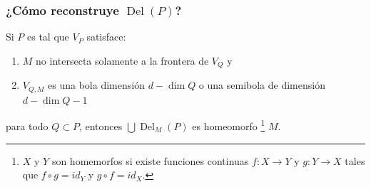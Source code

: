 \documentclass{beamer}
\makeatletter
\DeclarePairedDelimiter{\norm}{\|}{\|}
\let\oldnorm\norm
\def\norm{\@ifstar{\oldnorm}{\oldnorm*}}
\newcommand{\TT}{\mathcal{T}}
\DeclareMathOperator{\conv}{conv}
\DeclareMathOperator{\Del}{Del}
\makeatother
\begin{document}
%
%
\begin{frame}\frametitle{¿Cómo reconstruye \(\Del(P)\)?}
\begin{Teorema}
  Si \(P\) es tal que \(V_P\) satisface:
  \begin{enumerate}[1.]
    \item \(M\) no intersecta solamente a la frontera de \(V_Q\) y
    \item \(V_{Q,M}\) es una bola dimensión \(d-\dim Q\) o una semibola de dimensión \(d-\dim Q-1\)  
  \end{enumerate}
  para todo \(Q\subset P\), 
  entonces \(\bigcup \Del_{M}(P)\) es homeomorfo%
  \footnote[frame]{\(X\) y \(Y\) son homemorfos si existe funciones continuas \(f\colon X \to Y\)
  y \(g\colon Y \to X\) tales que \(f\circ g = id_Y\) y \(g\circ f = id_X\).}
  \(M\).
\end{Teorema}

\end{frame}
\end{document}
